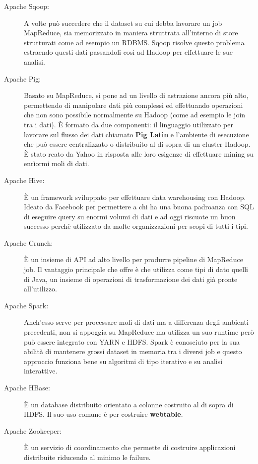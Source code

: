 \begin{description}
  \item[Apache Sqoop:] A volte può succedere che il dataset su cui debba lavorare un job MapReduce, sia memorizzato in maniera struttrata all'interno di store strutturati come ad esempio un RDBMS. Sqoop risolve questo problema estraendo questi dati passandoli così ad Hadoop per effettuare le sue analisi.
  \item[Apache Pig:] Basato su MapReduce, si pone ad un livello di astrazione ancora più alto, permettendo di manipolare dati più complessi ed effettuando operazioni che non sono possibile normalmente su Hadoop (come ad esempio le join tra i dati). È formato da due componenti: il linguaggio utilizzato per lavorare sul flusso dei dati chiamato \textbf{Pig Latin} e l'ambiente di esecuzione che può essere centralizzato o distribuito al di sopra di un cluster Hadoop. È stato reato da Yahoo in risposta alle loro esigenze di effettuare mining su enrìormi moli di dati. 
  \item[Apache Hive:] È un framework sviluppato per effettuare data warehousing con Hadoop. Ideato da Facebook per permettere a chi ha una buona padroanza con SQL di eseguire query su enormi volumi di dati e ad oggi riscuote un buon successo perchè utilizzato da molte organizzazioni per scopi di tutti i tipi.
  \item[Apache Crunch:] È un insieme di API ad alto livello per produrre pipeline di MapReduce job. Il vantaggio principale che offre è che utilizza come tipi di dato quelli di Java, un insieme di operazioni di trasformazione dei dati già pronte all'utilizzo.
  \item[Apache Spark:] Anch'esso serve per processare moli di dati ma a differenza degli ambienti precedenti, non si appoggia su MapReduce ma utilizza un suo runtime  però può essere integrato con YARN e HDFS. Spark è conosciuto per la sua abilità di mantenere grossi dataset in memoria tra i diversi job e questo approccio funziona bene su algoritmi di tipo iterativo e su analisi interattive.
  \item[Apache HBase:] È un database distribuito orientato a colonne costruito al di sopra di HDFS. Il suo uso comune è per costruire \textbf{webtable}.
  \item[Apache Zookeeper:] È un servizio di coordinamento che permette di costruire applicazioni distribuite riducendo al minimo le failure.
\end{description}

